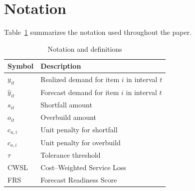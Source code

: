 \section{Notation}

Table~\ref{tab:notation} summarizes the notation used throughout the paper.

\begin{table}[h]
\centering
\caption{Notation and definitions}
\label{tab:notation}
\begin{tabular}{ll}
\hline
\textbf{Symbol} & \textbf{Description} \\
\hline
$y_{it}$ & Realized demand for item $i$ in interval $t$ \\
$\hat{y}_{it}$ & Forecast demand for item $i$ in interval $t$ \\
$s_{it}$ & Shortfall amount \\
$o_{it}$ & Overbuild amount \\
$c_{u,i}$ & Unit penalty for shortfall \\
$c_{o,i}$ & Unit penalty for overbuild \\
$\tau$ & Tolerance threshold \\
CWSL & Cost--Weighted Service Loss \\
FRS & Forecast Readiness Score \\
\hline
\end{tabular}
\end{table}

